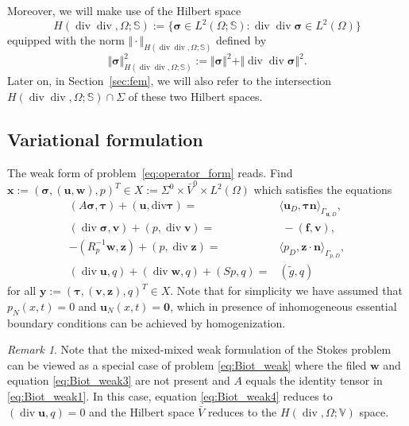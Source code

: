 \documentclass[11pt]{amsart}
\theoremstyle{remark}
\newtheorem{remark}{Remark}
\theoremstyle{definition}
\def\sig{{\bm \sigma}}
\def\bu{{\boldsymbol u}}
\def\bv{{\boldsymbol v}}
\def\bw{{\boldsymbol w}}
\def\bff{{\boldsymbol f}}
\renewcommand{\div}{\operatorname{div}}
\renewcommand{\div}{\operatorname{div}}
\def\sig{\boldsymbol \sigma}
\def\bu{\boldsymbol u}
\def\bv{\boldsymbol v}
\def\bw{\boldsymbol w}
\def\bx{\boldsymbol x}
\def\by{\boldsymbol y}
\def\bz{\boldsymbol z}
\def\bn{\boldsymbol n}
\def\divv{\text{div}}
\begin{document}
Moreover, we will make use of the Hilbert space
$$
H(\div \div,\Omega;\mathbb{S}) := \{ \sig  \in L^2(\Omega;\mathbb{S}): \div \div \sig \in  L^2(\Omega) \}
$$
equipped with the norm $\Vert \cdot \Vert_{H(\div \div,\Omega;\mathbb{S}) }$ defined by
$$
\Vert \sig \Vert_{H(\div \div,\Omega;\mathbb{S})}^2 := \Vert \sig \Vert^2 + \Vert \div \div \sig \Vert^2.
$$
Later on, in Section~\ref{sec:fem}, we will also refer to the intersection $H(\div \div,\Omega;\mathbb{S}) \cap \Sigma$ of these two Hilbert spaces.


\subsection{Variational formulation}\label{subsec:variational_formulation} 

The weak form of problem~\eqref{eq:operator_form} reads. Find
%
$\bx := (\sig,(\bu,\bw),p)^T \in X:= \Sigma^0 \times \bar{V}^0 \times L^2(\Omega)$ which satisfies the equations
\begin{subequations}\label{eq:Biot_weak}
\begin{align}   
(A \sig, \bm \tau) + (\bu,\divv \bm \tau) = &  \langle \bu_D, 
\bm \tau \bn \rangle_{\Gamma_{\bu,D}}, \label{eq:Biot_weak1}\\
%
(\div \bm \sigma,\bm v) + (p, \div \bv) = & \; -(\bff,\bv),  \label{eq:Biot_weak2}\\  
%
- (R_p^{-1}  \bw, \bz) + (p,\div \bz) = &
\langle p_{D}, \bz \cdot \bn \rangle_{\Gamma_{p,D}}, \label{eq:Biot_weak3} \\ 
%
(\div \bu, q) + (\div \bw, q) + (S p,q) = & (\tilde{g},q) \label{eq:Biot_weak4} 
\end{align}
\end{subequations}
for all $\by := (\bm \tau,(\bv,\bz),q)^T \in X$.
Note that for simplicity we have assumed that $p_{N}(x,t) = 0$ and ${\bu}_N(x,t)= \bm 0$, which in
presence of inhomogeneous essential boundary conditions can be achieved by homogenization.

\begin{remark} \label{Biot_Stokes}
Note that the mixed-mixed  weak formulation of the Stokes problem can be viewed as a special case of problem \eqref{eq:Biot_weak} where the filed $\bw$
and equation \eqref{eq:Biot_weak3} are not present and $A$ equals the identity tensor in \eqref{eq:Biot_weak1}. In this case, equation \eqref{eq:Biot_weak4} reduces to $(\div \bu, q)=0$ and the Hilbert space $\bar{V}$ reduces to the $H(\div,\Omega; \mathbb{V})$ space.
\end{remark}
\end{document}
